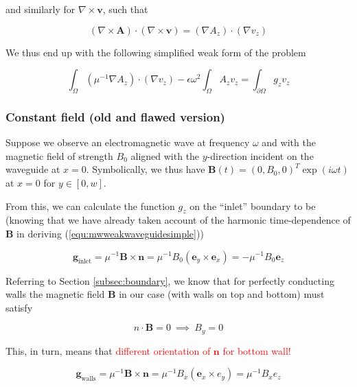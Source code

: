 \documentclass[11pt, a4paper]{article}
\begin{document}
and similarly for $\nabla \times \mathbf{v}$, such that

\begin{equation}
    (\nabla \times \mathbf{A}) \cdot (\nabla \times \mathbf{v}) = (\nabla A_z) \cdot (\nabla v_z)
\end{equation}

We thus end up with the following simplified weak form of the problem

\begin{equation}
    \int_{\Omega} (\mu^{-1} \nabla A_z) \cdot (\nabla v_z)
    - \epsilon \omega^2 \int_{\Omega} A_z v_z
    = \int_{\partial \Omega} g_z v_z \label{equ:mwweakwaveguidesimple}
\end{equation}

\subsubsection{Constant field (old and flawed version)}
\label{subsubsec:constfieldold}

Suppose we observe an electromagnetic wave at frequency $\omega$ and with the magnetic 
field of strength $B_0$ aligned with the $y$-direction incident on the waveguide
at $x=0$. Symbolically, we thus have $\mathbf{B}(t) = (0, B_0, 0)^T \exp(i \omega t)$
at $x=0$ for $y \in [0, w]$.

From this, we can calculate the function $g_z$ on the \enquote{inlet} boundary to be 
(knowing that we have already taken account of the harmonic time-dependence of 
$\mathbf{B}$ in deriving (\ref{equ:mwweakwaveguidesimple}))

\begin{equation}
    \mathbf{g}_{\text{inlet}} = \mu^{-1} \mathbf{B} \times \mathbf{n} = \mu^{-1} B_0 (\mathbf{e}_y \times \mathbf{e}_x) = -\mu^{-1} B_0 \mathbf{e}_z
\end{equation}

Referring to Section \ref{subsec:boundary}, we know that for perfectly conducting 
walls the magnetic field $\mathbf{B}$ in our case (with walls on top and bottom)
must satisfy 

\begin{equation}
    n \cdot \mathbf{B} = 0 ~ \implies ~ B_y = 0
\end{equation}

This, in turn, means that \textcolor{red}{different orientation of $\mathbf{n}$
for bottom wall!}

\begin{equation}
    \mathbf{g}_{\text{walls}} = \mu^{-1} \mathbf{B} \times \mathbf{n} = \mu^{-1} B_x (\mathbf{e}_x \times e_y) = \mu^{-1} B_x e_z
\end{equation}
\end{document}

